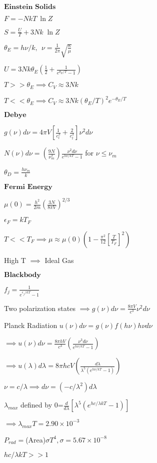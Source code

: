\documentclass{article}
\begin{document}
\begin{multicols}{3}
$\textbf{Einstein Solids}$

$F= -NkT\:\ln Z$

$S=\frac{U}{T} + 3Nk \;\ln Z$

$\theta_E = h \nu / k, \:\:\nu = \frac{1}{2 \pi} \sqrt{\frac{\kappa}{\mu}}$

$U=3Nk\theta_E (\frac{1}{2}+\frac{1}{e^{\theta_E/T}-1})$

$T>>\theta_E \implies C_V \approx 3Nk$

$T<<\theta_E \implies C_V \approx 3Nk(\theta_E/T)^2 e^{-\theta_E/T}$

$\textbf{Debye}$

$g(\nu)d\nu=4\pi V\left[ \frac{1}{c_l^3} + \frac{2}{c_t^3} \right] \nu^2d\nu$

$N(\nu)d\nu=\left(\frac{9N}{\nu_m^3}\right)\frac{\nu^2d\nu}{e^{h\nu/kT}-1}$ for $\nu \leq \nu_m$

$\theta_D=\frac{h\nu_m}{k}$

$\textbf{Fermi Energy}$

$\mu(0)=\frac{h^2}{2m} \left( \frac{3N}{8\pi V} \right)^{2/3}$

$\epsilon_F=k T_F$

$T<<T_F \implies \mu \approx \mu(0) \left ( 1-\frac{\pi^2}{12} \left[ \frac{T}{T_F} \right]^2 \right)$

High T $\implies$ Ideal Gas

$\textbf{Blackbody}$

$f_j=\frac{1}{e^{\epsilon_j/kT}-1}$

Two polarization states $\implies g(\nu)d\nu=\frac{8\pi V}{c^3}\nu^2d\nu$

Planck Radiation $u(\nu)d\nu=g(\nu)f(h\nu)h\nu d\nu$

$\implies u(\nu)d\nu=\frac{8\pi h V}{c^3} \left ( \frac{\nu^3 d\nu}{e^{h\nu /kT}-1} \right )$

$\implies u(\lambda)d\lambda=8\pi hcV \left ( \frac{d\lambda}{\lambda^5 (e^{h\nu /kT}-1)} \right )$

$\nu=c/\lambda \implies d\nu=(-c/\lambda^2)d\lambda$

$\lambda_{max}$ defined by 0=$\frac{d}{d\lambda}[\lambda^5(e^{hc/\lambda kT}-1)]$

$\implies \lambda_{max}T=2.90 \times 10^{-3}$

$P_{rad}=$(Area)$\sigma T^4, \sigma=5.67\times 10^{-8}$

$hc/\lambda kT >> 1$


\end{multicols}
\end{document}
